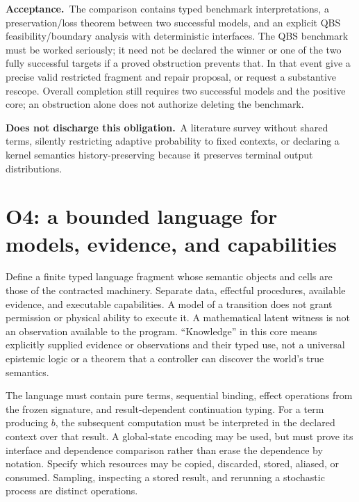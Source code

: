 \documentclass[11pt,a4paper]{article}
\newcommand{\accept}{\par\textbf{Acceptance.}\ }
\newcommand{\notaccepted}{\par\textbf{Does not discharge this obligation.}\ }
\begin{document}
\accept The comparison contains typed benchmark interpretations, a
preservation/loss theorem between two successful models, and an explicit
QBS feasibility/boundary analysis with deterministic interfaces. The QBS
benchmark must be worked seriously; it need not be declared the winner or
one of the two fully successful targets if a proved obstruction prevents
that. In that event give a precise valid restricted fragment and repair
proposal, or request a substantive rescope. Overall completion still
requires two successful models and the positive core; an obstruction alone
does not authorize deleting the benchmark.

\notaccepted A literature survey without shared terms, silently restricting
adaptive probability to fixed contexts, or declaring a kernel semantics
history-preserving because it preserves terminal output distributions.

\section{O4: a bounded language for models, evidence, and capabilities}\label{sec:o4}

Define a finite typed language fragment whose semantic objects and cells are
those of the contracted machinery. Separate data, effectful procedures,
available evidence, and executable capabilities. A model of a transition
does not grant permission or physical ability to execute it. A mathematical
latent witness is not an observation available to the program. ``Knowledge''
in this core means explicitly supplied evidence or observations and their
typed use, not a universal epistemic logic or a theorem that a controller
can discover the world's true semantics.

The language must contain pure terms, sequential binding, effect operations
from the frozen signature, and result-dependent continuation typing. For a
term producing \(b\), the subsequent computation must be interpreted in the
declared context over that result. A global-state encoding may be used, but
must prove its interface and dependence comparison rather than erase the
dependence by notation. Specify which resources may be copied, discarded,
stored, aliased, or consumed. Sampling, inspecting a stored result, and
rerunning a stochastic process are distinct operations.
\end{document}

